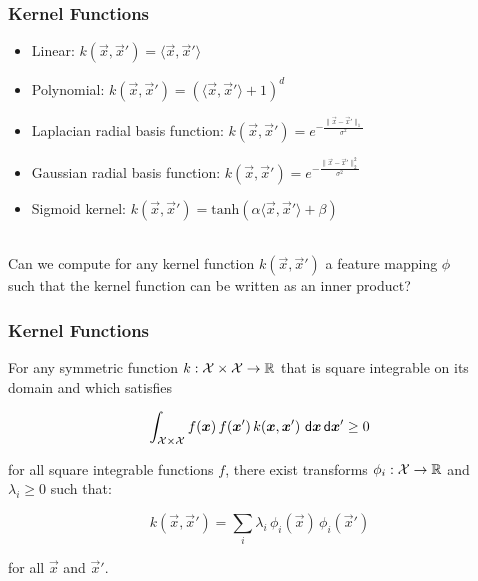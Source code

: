 \begin{frame}
	\frametitle{Kernel Functions \cont}

	 \pause

	\begin{itemize}
		\item Linear: $k(\vec x, \vec x') = \langle\vec x, \vec x'\rangle$ \\[.3cm] \pause
		\item Polynomial: $k(\vec x, \vec x') = (\langle\vec x, \vec x'\rangle+1)^d$ \\[.3cm] \pause
		\item Laplacian radial basis function: $k(\vec x, \vec x') = e^{-\frac{\|\vec x- \vec x'\|_1}{\sigma^2}}$ \\[.3cm] \pause
		\item Gaussian radial basis function: $k(\vec x, \vec x') = e^{-\frac{\|\vec x- \vec x'\|_2^2}{\sigma^2}}$ \\[.3cm] \pause
		\item Sigmoid kernel: $k(\vec x, \vec x') =\mbox{tanh}({ \alpha\langle\vec x, \vec x'\rangle+\beta})$
	\end{itemize}
	\pspread

	 \\[.1cm]
	Can we compute for any kernel function $k(\vec x, \vec x')$ a feature mapping $\phi$ \\
	such that the kernel function can be written as an inner product?
\end{frame}


\begin{frame}
	\frametitle{Kernel Functions \cont}

	\begin{theorem}
		For any symmetric function $k: {\cal X}\times {\cal X}\rightarrow \real$ that is square integrable on its domain and which satisfies

		\begin{displaymath}
			\int_{{\cal X}\times {\cal X}} f(\vec x)\,f(\vec x')\,k(\vec x, \vec x')\ \mathsf{d}\vec x\, \mathsf{d} \vec x' \geq 0
		\end{displaymath}

		for all square integrable functions $f$, there exist transforms $\phi_i: {\cal X}\rightarrow \real$ and $\lambda_i\geq 0$ such that:

		\begin{displaymath}
			k(\vec x, \vec x') = \sum_i \lambda_i \,\phi_i(\vec x)\,\phi_i(\vec x')
		\end{displaymath}

		for all $\vec x$ and $\vec x'$.
	\end{theorem}
\end{frame}


